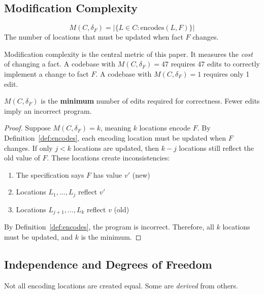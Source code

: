 \subsection{Modification Complexity}\label{sec:mod-complexity}

\begin{definition}\label{def:mod-complexity}
\[
M(C, \delta_F) = |\{L \in C : \text{encodes}(L, F)\}|
\]
The number of locations that must be updated when fact $F$ changes.
\end{definition}

Modification complexity is the central metric of this paper. It measures the \emph{cost} of changing a fact. A codebase with $M(C, \delta_F) = 47$ requires 47 edits to correctly implement a change to fact $F$. A codebase with $M(C, \delta_F) = 1$ requires only 1 edit.

\begin{theorem}\label{thm:correctness-forcing}
$M(C, \delta_F)$ is the \textbf{minimum} number of edits required for correctness. Fewer edits imply an incorrect program.
\end{theorem}

\begin{proof}
Suppose $M(C, \delta_F) = k$, meaning $k$ locations encode $F$. By Definition~\ref{def:encodes}, each encoding location must be updated when $F$ changes. If only $j < k$ locations are updated, then $k - j$ locations still reflect the old value of $F$. These locations create inconsistencies:

\begin{enumerate}
\tightlist
\item The specification says $F$ has value $v'$ (new)
\item Locations $L_1, \ldots, L_j$ reflect $v'$
\item Locations $L_{j+1}, \ldots, L_k$ reflect $v$ (old)
\end{enumerate}

By Definition~\ref{def:encodes}, the program is incorrect. Therefore, all $k$ locations must be updated, and $k$ is the minimum.
\end{proof}

\subsection{Independence and Degrees of Freedom}\label{sec:dof}

Not all encoding locations are created equal. Some are \emph{derived} from others.

